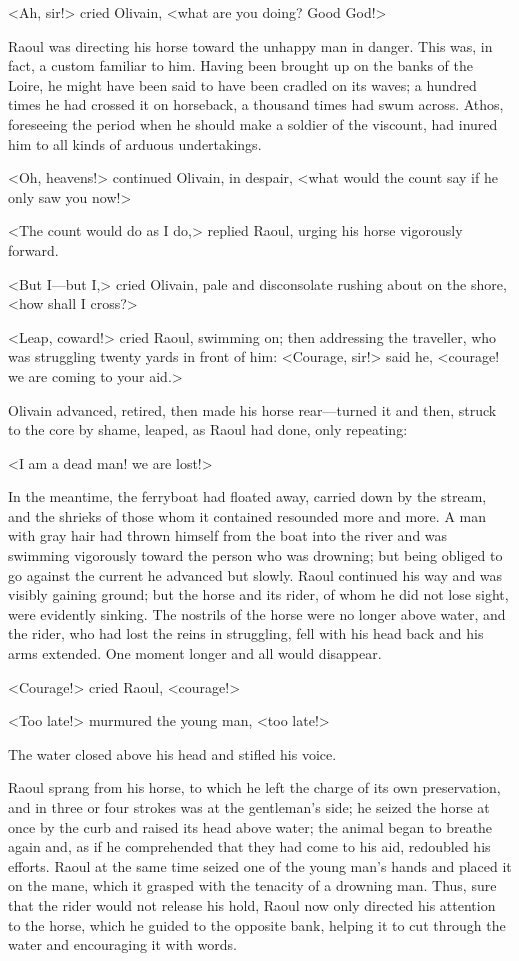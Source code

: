 <Ah, sir!> cried Olivain, <what are you doing? Good God!>

Raoul was directing his horse toward the unhappy man in danger. This was, in fact, a custom familiar to him. Having been brought up on the banks of the Loire, he might have been said to have been cradled on its waves; a hundred times he had crossed it on horseback, a thousand times had swum across. Athos, foreseeing the period when he should make a soldier of the viscount, had inured him to all kinds of arduous undertakings.

<Oh, heavens!> continued Olivain, in despair, <what would the count say if he only saw you now!>

<The count would do as I do,> replied Raoul, urging his horse vigorously forward.

<But I—but I,> cried Olivain, pale and disconsolate rushing about on the shore, <how shall I cross?>

<Leap, coward!> cried Raoul, swimming on; then addressing the traveller, who was struggling twenty yards in front of him: <Courage, sir!> said he, <courage! we are coming to your aid.>

Olivain advanced, retired, then made his horse rear—turned it and then, struck to the core by shame, leaped, as Raoul had done, only repeating:

<I am a dead man! we are lost!>

In the meantime, the ferryboat had floated away, carried down by the stream, and the shrieks of those whom it contained resounded more and more. A man with gray hair had thrown himself from the boat into the river and was swimming vigorously toward the person who was drowning; but being obliged to go against the current he advanced but slowly. Raoul continued his way and was visibly gaining ground; but the horse and its rider, of whom he did not lose sight, were evidently sinking. The nostrils of the horse were no longer above water, and the rider, who had lost the reins in struggling, fell with his head back and his arms extended. One moment longer and all would disappear.

<Courage!> cried Raoul, <courage!>

<Too late!> murmured the young man, <too late!>

The water closed above his head and stifled his voice.

Raoul sprang from his horse, to which he left the charge of its own preservation, and in three or four strokes was at the gentleman's side; he seized the horse at once by the curb and raised its head above water; the animal began to breathe again and, as if he comprehended that they had come to his aid, redoubled his efforts. Raoul at the same time seized one of the young man's hands and placed it on the mane, which it grasped with the tenacity of a drowning man. Thus, sure that the rider would not release his hold, Raoul now only directed his attention to the horse, which he guided to the opposite bank, helping it to cut through the water and encouraging it with words.

